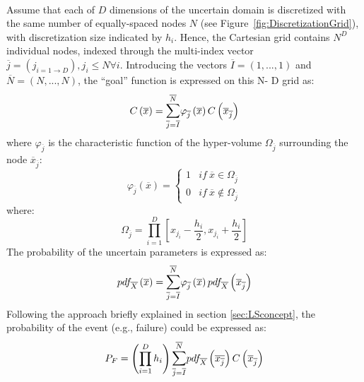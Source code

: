 \\Assume that each of $D$ dimensions of the uncertain domain is 
discretized with the same number of equally-spaced nodes $N$ (see 
Figure~\ref{fig:DiscretizationGrid}), with discretization size indicated 
by $h_{i}$. Hence, the Cartesian grid contains $N^{D}$ individual 
nodes, indexed through the multi-index vector $\overline{j} = \left ( 
j_{i=1\rightarrow D} \right ), j_{i} \leq N \forall i$. Introducing the 
vectors  $\overline{I} = (1, ..., 1)$ and
$\overline{N} = (N, ..., N)$, the ``goal'' function is expressed on this N-
D grid as:
\begin{equation}
C\left ( \overline{x} \right ) = 
\mathlarger{\sum}_{\overline{j}=\overline{I}}^{\overline{N}} \varphi_{\overline{j}}\left 
( \overline{x} \right ) C\left ( \overline{x}_{\overline{j}} \right )
\end{equation}
where $\varphi_{\overline{j}}$ is the characteristic function of the hyper-volume $\Omega_{\overline{j}}$ surrounding the node 
 $\overline{x}_{\overline{j}}$:
 \begin{equation}
 \varphi_{\overline{j}}\left ( \overline{x} \right ) = 
\left\{\begin{matrix}
1 & if \: \overline{x} \in \Omega_{\overline{j}} \\ 
0 & if \: \overline{x} \notin \Omega_{\overline{j}} 
\end{matrix}\right.
\end{equation}
where:
 \begin{equation}
 \label{eq:OmegaEq}
 \Omega_{\overline{j}} = \prod_{i=1}^{D}\left [ x_{j_{i}} - \frac{h_{i}}{2}, 
 x_{j_{i}} + \frac{h_{i}}{2}  \right ]
 \end{equation}
 The probability of the uncertain parameters is expressed as:
 \begin{equation} 
 pdf_{\overline{X}}\left ( \overline{x} \right ) = 
\mathlarger{\sum}_{\overline{j}=\overline{I}}^{\overline{N}}
\varphi_{\overline{j}}\left ( \overline{x} \right )
pdf_{\overline{X}}\left ( \overline{x}_{\overline{j}} \right )
 \end{equation}
Following the approach briefly explained in section 
\ref{sec:LSconcept}, the probability of the event (e.g., failure) could be 
expressed as: 
 \begin{equation} 
 \label{eq:Pf}
  P_{F}=\left ( \prod_{i=1}^{D}h_{i} \right ) 
  \mathlarger{\sum}_{\overline{j}=
  \overline{I}}^{\overline{N}}pdf_{\overline{X}}\left ( 
  \overline{x_{\overline{j}}} \right )
  C\left ( \overline{x}_{\overline{j}} \right )
 \end{equation}
